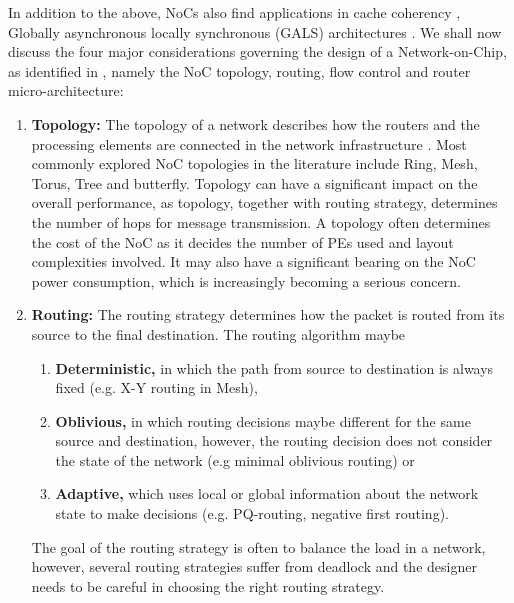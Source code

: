 \hspace{5mm}In addition to the above, NoCs also find applications in cache coherency \cite{five}, Globally asynchronous locally synchronous (GALS) architectures \cite{fourteen}. We shall now discuss the four major considerations governing the design of a Network-on-Chip, as identified in \cite{4209016}, namely the NoC topology, routing, flow control and router micro-architecture:
\begin{enumerate} 
	\item{\textbf{Topology:} The topology of a network describes how the routers and the processing elements are connected in the network infrastructure \cite{6893205}. Most commonly explored NoC topologies in the literature include Ring, Mesh, Torus, Tree and butterfly. Topology can have a significant impact on the overall performance, as topology, together with routing strategy, determines the number of hops for message transmission. A topology often determines the cost of the NoC as it decides the number of PEs used and layout complexities involved. It may also have a significant bearing on the NoC power consumption, which is increasingly becoming a serious concern.}
	\item{\textbf{Routing:} The routing strategy determines how the packet is routed from its source to the final destination. The routing algorithm maybe}
	\begin{enumerate} 
		\item{\textbf{Deterministic,} in which the path from source to destination is always fixed (e.g. X-Y routing in Mesh),}
		\item{\textbf{Oblivious,} in which routing decisions maybe different for the same source and destination, however, the routing decision does not consider the state of the network (e.g minimal oblivious routing) or }
		\item{\textbf{Adaptive,} which uses local or global information about the network state to make decisions (e.g. PQ-routing, negative first routing).}
	\end{enumerate}
	
\hspace{5mm}The goal of the routing strategy is often to balance the load in a network, however, several routing strategies suffer from deadlock and the designer needs to be careful in choosing the right routing strategy.


\end{enumerate}
